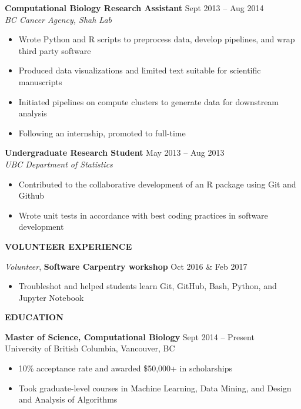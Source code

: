 \documentclass{res}
\renewcommand{\section}[1]{%
  \vspace{0.3in}%
  \centerline{\uppercase{\bf{#1}}}%
  \vspace{-6pt}}
\newcommand{\linehead}[2]{%
  {\bf #1} \hfill #2\\}
\newcommand{\linevolunteer}[3]{%
  {\sl #3}, {\bf #2} \hfill #1}%
\begin{document}
\begin{resume}
{\bf Computational Biology Research Assistant} \hfill Sept 2013 -- Aug 2014\\
{\it BC Cancer Agency, Shah Lab}
\begin{itemize}
  \item Wrote Python and R scripts to preprocess data, develop pipelines, and wrap third party software
  \item Produced data visualizations and limited text suitable for scientific manuscripts
  \item Initiated pipelines on compute clusters to generate data for downstream analysis
  \item Following an internship, promoted to full-time
\end{itemize}

{\bf Undergraduate Research Student} \hfill May 2013 -- Aug 2013\\
{\it UBC Department of Statistics}
\begin{itemize}
  \item Contributed to the collaborative development of an R package using Git and Github
  \item Wrote unit tests in accordance with best coding practices in software development
\end{itemize}

\section{Volunteer experience}
\linevolunteer{Oct 2016 \& Feb 2017}{%
  Software Carpentry workshop}{%
  Volunteer}
\begin{itemize}
  \item Troubleshot and helped students learn Git, GitHub, Bash, Python, and Jupyter Notebook
\end{itemize}

\section{Education}
\linehead{Master of Science, Computational Biology}{Sept 2014 -- Present}
University of British Columbia, Vancouver, BC
\begin{itemize}
  \item 10\% acceptance rate and awarded \$50,000+ in scholarships
  \item Took graduate-level courses in Machine Learning, Data Mining, and Design and Analysis of Algorithms
\end{itemize}
\pagebreak

\end{resume}
\end{document}

